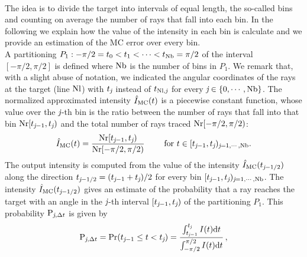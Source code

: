 \\ \indent The idea is to divide the target into intervals of equal length, the so-called bins and counting on average the number  of rays that fall into each bin. 
In the following we explain how the value of the intensity in each bin is calculate and we provide an estimation of the MC error over every bin. \\ \indent A partitioning
$P_1: -\pi/2 = t_{0}<t_{1}<\cdots <t_{\textrm{Nb}}=\pi/2$ of the interval $[-\pi/2, \pi/2]$ is defined where $\textrm{Nb}$ is the number of bins in $P_1$.
We remark that, with a slight abuse of notation, we indicated the angular coordinates of the rays at the target (line $\textrm{Nl}$) with $t_{\textit{j}}$ instead of $t_{\textrm{Nl},\textit{j}}$ for every $\textit{j}\in\{0, \cdots, \textrm{Nb}\}$. 
The normalized approximated intensity $\hat{I}_{\textrm{MC}}(t)$ is a piecewise constant function, whose value over the $\textit{j}$-th bin is the ratio between the number of rays that fall into that bin
$\textrm{Nr}[t_{\textit{j}-1},t_{\textit{j}})$ and the total number of rays traced $\textrm{Nr}[-\pi/2, \pi/2)$:
\begin{equation} \label{g_mc}
\hat{I}_{\textrm{MC}}(t) = \frac{\textrm{Nr}[t_{\textit{j}-1},t_{\textit{j}})}{\textrm{Nr}[-\pi/2, \pi/2)} \qquad \mbox{ for } t\in[t_{\textit{j}-1}, t_{\textit{j}})_{\textit{j}=1, \cdots, \textrm{Nb}}.
\end{equation}
The output intensity is computed from the value of the intensity $\hat{I}_{\textrm{MC}}(t_{\textit{j}-1/2})$ along the direction $t_{\textit{j}-1/2}=(t_{\textit{j}-1}+
t_{\textit{j}})/2$ for every bin $[t_{\textit{j}-1},t_{\textit{j}})_{\textit{j} = 1, \cdots, \textrm{Nb}}$.
 The intensity $\hat{I}_{\textrm{MC}}(t_{\textit{j}-1/2})$ gives an estimate of the probability that a ray reaches the target with an angle in the $\textit{j}$-th interval
$[t_{\textit{j}-1}, t_{\textit{j}})$ of the partitioning $P_1$. This probability $\textrm{P}_{\textit{j}, \Delta t}$ is given by
\begin{equation}\label{eq:probability}
\textrm{P}_{\textit{j}, \Delta t} = \Pr(t_{\textit{j}-1}\leq t<t_{\textit{j}})=
\frac{\int_{t_{\textit{j}-1}}^{t_{\textit{j}}} I(t) \textrm{d}t}{\int_{-\pi/2}^{\pi/2}I(t) \textrm{d}t}\,,
\end{equation}
